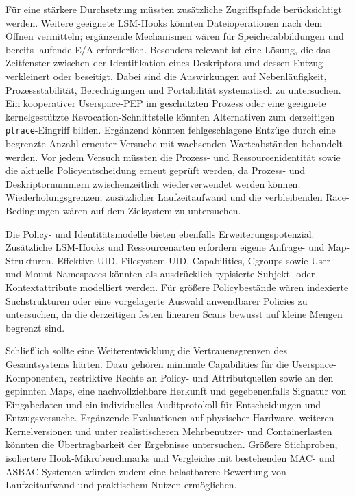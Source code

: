 Für eine stärkere Durchsetzung müssten zusätzliche Zugriffspfade berücksichtigt werden. Weitere geeignete LSM-Hooks könnten Dateioperationen nach dem Öffnen vermitteln; ergänzende Mechanismen wären für Speicherabbildungen und bereits laufende E/A erforderlich. Besonders relevant ist eine Lösung, die das Zeitfenster zwischen der Identifikation eines Deskriptors und dessen Entzug verkleinert oder beseitigt. Dabei sind die Auswirkungen auf Nebenläufigkeit, Prozessstabilität, Berechtigungen und Portabilität systematisch zu untersuchen. Ein kooperativer Userspace-PEP im geschützten Prozess oder eine geeignete kernelgestützte Revocation-Schnittstelle könnten Alternativen zum derzeitigen \texttt{ptrace}-Eingriff bilden. Ergänzend könnten fehlgeschlagene Entzüge durch eine begrenzte Anzahl erneuter Versuche mit wachsenden Warteabständen behandelt werden. Vor jedem Versuch müssten die Prozess- und Ressourcenidentität sowie die aktuelle Policyentscheidung erneut geprüft werden, da Prozess- und Deskriptornummern zwischenzeitlich wiederverwendet werden können. Wiederholungsgrenzen, zusätzlicher Laufzeitaufwand und die verbleibenden Race-Bedingungen wären auf dem Zielsystem zu untersuchen.

Die Policy- und Identitätsmodelle bieten ebenfalls Erweiterungspotenzial. Zusätzliche LSM-Hooks und Ressourcenarten erfordern eigene Anfrage- und Map-Strukturen. Effektive-UID, Filesystem-UID, Capabilities, Cgroups sowie User- und Mount-Namespaces könnten als ausdrücklich typisierte Subjekt- oder Kontextattribute modelliert werden. Für größere Policybestände wären indexierte Suchstrukturen oder eine vorgelagerte Auswahl anwendbarer Policies zu untersuchen, da die derzeitigen festen linearen Scans bewusst auf kleine Mengen begrenzt sind.

Schließlich sollte eine Weiterentwicklung die Vertrauensgrenzen des Gesamtsystems härten. Dazu gehören minimale Capabilities für die Userspace-Komponenten, restriktive Rechte an Policy- und Attributquellen sowie an den gepinnten Maps, eine nachvollziehbare Herkunft und gegebenenfalls Signatur von Eingabedaten und ein individuelles Auditprotokoll für Entscheidungen und Entzugsversuche. Ergänzende Evaluationen auf physischer Hardware, weiteren Kernelversionen und unter realistischeren Mehrbenutzer- und Containerlasten könnten die Übertragbarkeit der Ergebnisse untersuchen. Größere Stichproben, isoliertere Hook-Mikrobenchmarks und Vergleiche mit bestehenden MAC- und ASBAC-Systemen würden zudem eine belastbarere Bewertung von Laufzeitaufwand und praktischem Nutzen ermöglichen.

\newpage
